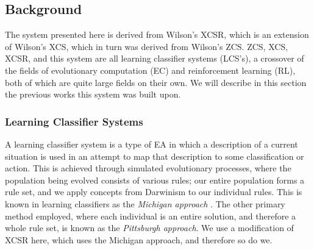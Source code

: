 \subsection{Background}
The system presented here is derived from Wilson's XCSR, which is an extension of Wilson's XCS, which in turn was derived from Wilson's ZCS.
ZCS, XCS, XCSR, and this system are all learning classifier systems (LCS's), a crossover of the fields of evolutionary computation (EC) and reinforcement learning (RL), both of which are quite large fields on their own.
We will describe in this section the previous works this system was built upon.





\subsubsection{Learning Classifier Systems}
A learning classifier system is a type of EA in which a description of a current situation is used in an attempt to map that description to some classification or action.
This is achieved through simulated evolutionary processes, where the population being evolved consists of various rules;
our entire population forms a rule set, and we apply concepts from Darwinism to our individual rules.
This is known in learning classifiers as the \emph{Michigan approach} \cite{EibenSmith}.
The other primary method employed, where each individual is an entire solution, and therefore a whole rule set, is known as the \emph{Pittsburgh approach}.
We use a modification of XCSR here, which uses the Michigan approach, and therefore so do we.



\newpage




